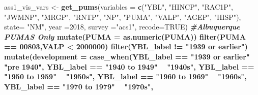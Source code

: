 \documentclass[
]{article}
\newenvironment{Shaded}{\begin{snugshade}}{\end{snugshade}}
\newcommand{\CommentTok}[1]{\textcolor[rgb]{0.56,0.35,0.01}{\textit{#1}}}
\newcommand{\DataTypeTok}[1]{\textcolor[rgb]{0.13,0.29,0.53}{#1}}
\newcommand{\DecValTok}[1]{\textcolor[rgb]{0.00,0.00,0.81}{#1}}
\newcommand{\KeywordTok}[1]{\textcolor[rgb]{0.13,0.29,0.53}{\textbf{#1}}}
\newcommand{\NormalTok}[1]{#1}
\newcommand{\OperatorTok}[1]{\textcolor[rgb]{0.81,0.36,0.00}{\textbf{#1}}}
\newcommand{\OtherTok}[1]{\textcolor[rgb]{0.56,0.35,0.01}{#1}}
\newcommand{\StringTok}[1]{\textcolor[rgb]{0.31,0.60,0.02}{#1}}
\begin{document}
\begin{Shaded}
\begin{Highlighting}[]
\NormalTok{ass1_vis_vars <-}\StringTok{  }\KeywordTok{get_pums}\NormalTok{(}\DataTypeTok{variables =} \KeywordTok{c}\NormalTok{(}\StringTok{"YBL"}\NormalTok{, }
                                          \StringTok{"HINCP"}\NormalTok{,}
                                          \StringTok{"RAC1P"}\NormalTok{, }
                                          \StringTok{"JWMNP"}\NormalTok{,}
                                          \StringTok{"MRGP"}\NormalTok{,}
                                          \StringTok{"RNTP"}\NormalTok{,}
                                          \StringTok{"NP"}\NormalTok{, }
                                          \StringTok{"PUMA"}\NormalTok{, }
                                         \StringTok{"VALP"}\NormalTok{, }
                                         \StringTok{"AGEP"}\NormalTok{,}
                                         \StringTok{"HISP"}\NormalTok{),}
                \DataTypeTok{state=} \StringTok{"NM"}\NormalTok{,}
                \DataTypeTok{year =}\DecValTok{2018}\NormalTok{,}
                \DataTypeTok{survey =}\StringTok{"acs1"}\NormalTok{,}
                \DataTypeTok{recode=}\OtherTok{TRUE}\NormalTok{) }\OperatorTok{%>%}
\StringTok{  }
\StringTok{                }\CommentTok{#Albuquerque PUMAS Only}
\StringTok{                }\KeywordTok{mutate}\NormalTok{(}\DataTypeTok{PUMA =} \KeywordTok{as.numeric}\NormalTok{(PUMA))}\OperatorTok{%>%}
\StringTok{               }\KeywordTok{filter}\NormalTok{(PUMA }\OperatorTok{==}\StringTok{ }\DecValTok{00803}\NormalTok{,VALP }\OperatorTok{<}\StringTok{ }\DecValTok{2000000}\NormalTok{)}\OperatorTok{%>%}
\StringTok{                }\KeywordTok{filter}\NormalTok{(YBL_label }\OperatorTok{!=}\StringTok{ "1939 or earlier"}\NormalTok{)}\OperatorTok{%>%}
\StringTok{  }
\KeywordTok{mutate}\NormalTok{(}\DataTypeTok{development =} \KeywordTok{case_when}\NormalTok{(YBL_label }\OperatorTok{==}\StringTok{ "1939 or earlier"} \OperatorTok{~}\StringTok{ "pre 1940"}\NormalTok{, }
\NormalTok{                        YBL_label }\OperatorTok{==}\StringTok{ "1940 to 1949"} \OperatorTok{~}\StringTok{ "1940s"}\NormalTok{,}
\NormalTok{                        YBL_label }\OperatorTok{==}\StringTok{ "1950 to 1959"} \OperatorTok{~}\StringTok{ "1950s"}\NormalTok{,}
\NormalTok{                        YBL_label }\OperatorTok{==}\StringTok{ "1960 to 1969"} \OperatorTok{~}\StringTok{ "1960s"}\NormalTok{,}
\NormalTok{                        YBL_label }\OperatorTok{==}\StringTok{ "1970 to 1979"} \OperatorTok{~}\StringTok{ "1970s"}\NormalTok{,}
}}}}
\end{Highlighting}
\end{Shaded}
\end{document}
